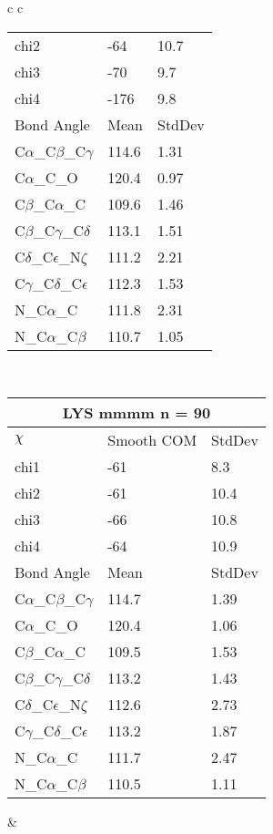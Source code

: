 \begin{longtable}{ c c }
\begin{tabular}{ l l l }
  chi2 & -64 & 10.7 \\ 
  chi3 & -70 & 9.7 \\ 
  chi4 & -176 & 9.8 \\ \midrule
  Bond Angle   & Mean     & StdDev \\ \midrule
  C$\alpha$\_C$\beta$\_C$\gamma$ & 114.6 & 1.31\\
  C$\alpha$\_C\_O & 120.4 & 0.97\\
  C$\beta$\_C$\alpha$\_C & 109.6 & 1.46\\
  C$\beta$\_C$\gamma$\_C$\delta$ & 113.1 & 1.51\\
  C$\delta$\_C$\epsilon$\_N$\zeta$ & 111.2 & 2.21\\
  C$\gamma$\_C$\delta$\_C$\epsilon$ & 112.3 & 1.53\\
  N\_C$\alpha$\_C & 111.8 & 2.31\\
  N\_C$\alpha$\_C$\beta$ & 110.7 & 1.05\\
  \bottomrule
  \end{tabular}
  \\
  \begin{tabular}{ l l l }
  \toprule
  \multicolumn{3}{c}{LYS \textbf{mmmm} n = 90} \\ \toprule
  $\chi$       & Smooth COM & StdDev \\ \midrule
  chi1 & -61 & 8.3 \\ 
  chi2 & -61 & 10.4 \\ 
  chi3 & -66 & 10.8 \\ 
  chi4 & -64 & 10.9 \\ \midrule
  Bond Angle   & Mean     & StdDev \\ \midrule
  C$\alpha$\_C$\beta$\_C$\gamma$ & 114.7 & 1.39\\
  C$\alpha$\_C\_O & 120.4 & 1.06\\
  C$\beta$\_C$\alpha$\_C & 109.5 & 1.53\\
  C$\beta$\_C$\gamma$\_C$\delta$ & 113.2 & 1.43\\
  C$\delta$\_C$\epsilon$\_N$\zeta$ & 112.6 & 2.73\\
  C$\gamma$\_C$\delta$\_C$\epsilon$ & 113.2 & 1.87\\
  N\_C$\alpha$\_C & 111.7 & 2.47\\
  N\_C$\alpha$\_C$\beta$ & 110.5 & 1.11\\
  \bottomrule
  \end{tabular}
  &
  \\
  
\end{longtable}

\newpage
